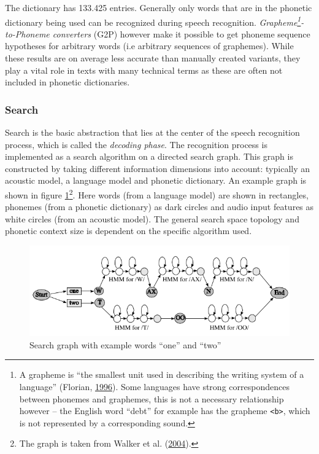 \documentclass[]{article}
\begin{document}
The dictionary has 133.425 entries. Generally only words that are in the
phonetic dictionary being used can be recognized during speech
recognition. \emph{Grapheme\footnote{A grapheme is ``the smallest unit
  used in describing the writing system of a language'' (Florian,
  \hyperref[ref-florian1996blackwell]{1996}). Some languages have strong
  correspondences between phonemes and graphemes, this is not a
  necessary relationship however -- the English word ``debt'' for
  example has the grapheme \texttt{\textless{}b\textgreater{}}, which is
  not represented by a corresponding sound.}-to-Phoneme converters}
(G2P) however make it possible to get phoneme sequence hypotheses for
arbitrary words (i.e arbitrary sequences of graphemes). While these
results are on average less accurate than manually created variants,
they play a vital role in texts with many technical terms as these are
often not included in phonetic dictionaries.

\subsubsection{Search}\label{search}

Search is the basic abstraction that lies at the center of the speech
recognition process, which is called the \emph{decoding phase}. The
recognition process is implemented as a search algorithm on a directed
search graph. This graph is constructed by taking different information
dimensions into account: typically an acoustic model, a language model
and phonetic dictionary. An example graph is shown in figure
\ref{graph}\footnote{The graph is taken from Walker et al.
  (\hyperref[ref-whitepaper]{2004}).}. Here words (from a language
model) are shown in rectangles, phonemes (from a phonetic dictionary) as
dark circles and audio input features as white circles (from an acoustic
model). The general search space topology and phonetic context size is
dependent on the specific algorithm used.

\begin{figure}[htbp]
\centering
\includegraphics{images/graph.png}
\caption{Search graph with example words ``one'' and
``two''\label{graph}}
\end{figure}
\end{document}
